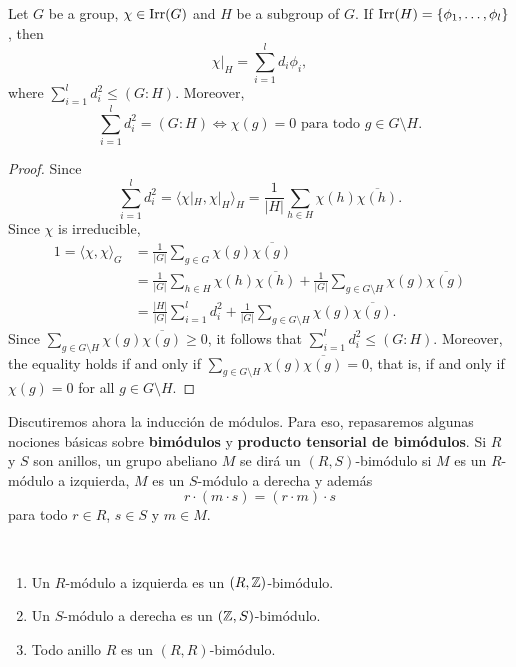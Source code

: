 \begin{proposition}
    Let $G$ be a group, $\chi\in\operatorname{Irr}(G)$ and $H$ be a subgroup of $G$. 
    If $\operatorname{Irr}(H)=\{\phi_1,\dots,\phi_l\}$, then 
    \[
    \chi|_H=\sum_{i=1}^ld_i\phi_i,
    \]
    where $\sum_{i=1}^l d_i^2\leq (G:H)$. Moreover, 
    \[
    \sum_{i=1}^l d_i^2=(G:H) 
    \Longleftrightarrow
    \chi(g)=0\text{ para todo $g\in G\setminus H$.}
    \]
\end{proposition}

\begin{proof}
    Since  
    \[
    \sum_{i=1}^ld_i^2=\langle\chi|_H,\chi|_H\rangle_H=\frac{1}{|H|}\sum_{h\in H}\chi(h)\overline{\chi(h)}.
    \]
    Since $\chi$ is irreducible, 
    \begin{align*}
        1=\langle\chi,\chi\rangle_G&=\frac{1}{|G|}\sum_{g\in G}\chi(g)\overline{\chi(g)}\\
        &=\frac{1}{|G|}\sum_{h\in H}\chi(h)\overline{\chi(h)}
        +\frac{1}{|G|}\sum_{g\in G\setminus H}\chi(g)\overline{\chi(g)}\\
        &=\frac{|H|}{|G|}\sum_{i=1}^l d_i^2+\frac{1}{|G|}\sum_{g\in G\setminus H}\chi(g)\overline{\chi(g)}.
    \end{align*}
    Since $\sum_{g\in G\setminus H}\chi(g)\overline{\chi(g)}\geq0$, it follows that
    $\sum_{i=1}^ld_i^2\leq(G:H)$. Moreover, 
    the equality holds if and only if $\sum_{g\in G\setminus H}\chi(g)\overline{\chi(g)}=0$, 
    that is, if and only if $\chi(g)=0$ for all $g\in G\setminus H$.
\end{proof}




Discutiremos ahora la inducción de módulos. Para eso, repasaremos algunas nociones básicas sobre
\textbf{bimódulos} y \textbf{producto tensorial de bimódulos}. 
Si $R$ y $S$ son anillos, un grupo abeliano $M$ se dirá un $(R,S)$-bimódulo si 
$M$ es un $R$-módulo a izquierda, $M$ es un $S$-módulo a derecha y además
\[
r\cdot (m\cdot s)=(r\cdot m)\cdot s
\]
para todo $r\in R$, $s\in S$ y $m\in M$. 

\begin{examples}\
\begin{enumerate}
    \item Un $R$-módulo a izquierda es un $(R,\mathbb{Z})$-bimódulo.
    \item Un $S$-módulo a derecha es un $(\mathbb{Z},S)$-bimódulo.
    \item Todo anillo $R$ es un $(R,R)$-bimódulo.
\end{enumerate}
\end{examples}

